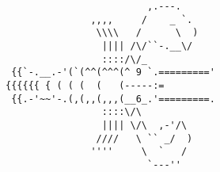 \documentclass{article}
\begin{document}
\vfill
\centering
\small
\begin{BVerbatim}
                         ,.---.   
               ,,,,     /    _ `.
                \\\\   /      \  )
                 |||| /\/``-.__\/
                 ::::/\/_
 {{`-.__.-'(`(^^(^^^(^ 9 `.========='
{{{{{{ { ( ( (  (   (-----:=
 {{.-'~~'-.(,(,,(,,,(__6_.'=========.
                 ::::\/\ 
                 |||| \/\  ,-'/\
                ////   \ `` _/  )
               ''''     \  `   /
                         `---''
\end{BVerbatim}
\end{document}
